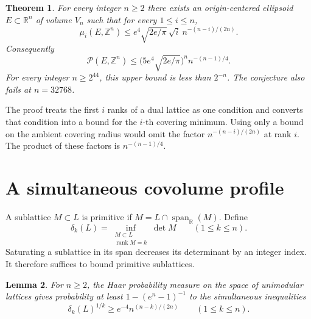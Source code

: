 \documentclass[11pt]{article}
\newtheorem{theorem}{Theorem}
\newtheorem{lemma}[theorem]{Lemma}
\newcommand{\R}{\mathbb R}
\newcommand{\Z}{\mathbb Z}
\newcommand{\rk}{\operatorname{rank}}
\newcommand{\Pcov}{\mathcal P}
\begin{document}
\begin{theorem}\label{thm:main}
For every integer \(n\ge2\) there exists an origin-centered ellipsoid
\(E\subset\R^n\) of volume \(V_n\) such that for every \(1\le i\le n\),
\begin{equation}\label{eq:profile}
 \mu_i(E,\Z^n)
 \le e^4\sqrt{2e/\pi}\,\sqrt i\ n^{-(n-i)/(2n)}.
\end{equation}
Consequently
\begin{equation}\label{eq:result}
 \Pcov(E,\Z^n)
 \le \bigl(5e^4\sqrt{2e/\pi}\bigr)^n n^{-(n-1)/4}.
\end{equation}
For every integer \(n\ge 2^{44}\), this upper bound is less
than \(2^{-n}\). The conjecture also fails at \(n=32768\).
\end{theorem}

The proof treats the first \(i\) ranks of a dual lattice as one
condition and converts that condition into a bound for the \(i\)-th
covering minimum. Using only a bound on the ambient covering radius
would omit the factor \(n^{-(n-i)/(2n)}\) at rank \(i\).
The product of these factors is \(n^{-(n-1)/4}\).

\section{A simultaneous covolume profile}

A sublattice \(M\subset L\) is primitive if
\(M=L\cap\operatorname{span}_{\R}(M)\). Define
\[
 \delta_k(L)=\inf_{\substack{M\subset L\\\rk M=k}}\det M
 \qquad (1\le k\le n).
\]
Saturating a sublattice in its span decreases its determinant by an
integer index. It therefore suffices to bound primitive sublattices.

\begin{lemma}\label{lem:profile}
For \(n\ge2\), the Haar probability measure on the space of
unimodular lattices gives probability at least
\(1-(e^n-1)^{-1}\) to the simultaneous inequalities
\begin{equation}\label{eq:deltas}
 \delta_k(L)^{1/k}\ge e^{-4}n^{(n-k)/(2n)}
 \qquad(1\le k\le n).
\end{equation}
\end{lemma}
\end{document}
